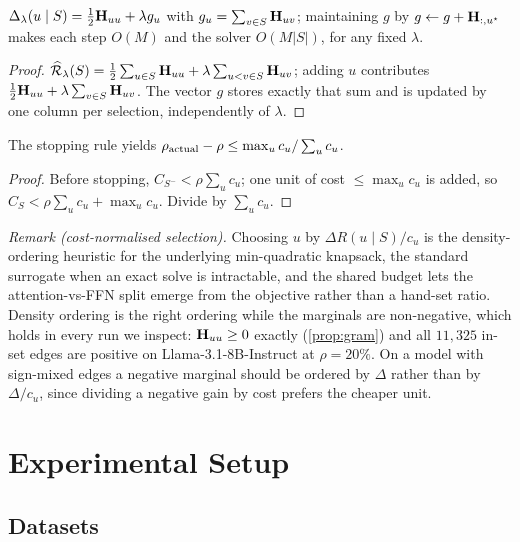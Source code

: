 \label{app:th-solver}
\begin{proposition}\label{prop:greedy}
$\Delta_\lambda(u\mid S)=\tfrac12\mathbf{H}_{uu}+\lambda g_u$ with $g_u=\sum_{v\in S}\mathbf{H}_{uv}$;
maintaining $g$ by $g\leftarrow g+\mathbf{H}_{:,u^\star}$ makes each step $O(M)$ and the solver $O(M|S|)$,
for any fixed $\lambda$.
\end{proposition}
\begin{proof}
$\widehat{\mathcal R}_\lambda(S)=\tfrac12\sum_{u\in S}\mathbf{H}_{uu}+\lambda\sum_{u<v\in S}\mathbf{H}_{uv}$;
adding $u$ contributes $\tfrac12\mathbf{H}_{uu}+\lambda\sum_{v\in S}\mathbf{H}_{uv}$. The vector $g$ stores
exactly that sum and is updated by one column per selection, independently of $\lambda$.
\end{proof}
\begin{proposition}\label{prop:overshoot}
The stopping rule yields $\rho_{\rm actual}-\rho\le \max_u c_u/\sum_u c_u$.
\end{proposition}
\begin{proof}
Before stopping, $C_{S^-}<\rho\sum_u c_u$; one unit of cost $\le\max_u c_u$ is added, so
$C_S<\rho\sum_u c_u+\max_u c_u$. Divide by $\sum_u c_u$.
\end{proof}
\noindent\emph{Remark (cost-normalised selection).} Choosing $u$ by $\Delta R(u\mid S)/c_u$ is the
density-ordering heuristic for the underlying min-quadratic knapsack, the standard surrogate when an
exact solve is intractable, and the shared budget lets the attention-vs-FFN split emerge from the
objective rather than a hand-set ratio. Density ordering is the right ordering while the marginals are
non-negative, which holds in every run we inspect: $\mathbf{H}_{uu}\ge0$ exactly (\cref{prop:gram}) and all
$11{,}325$ in-set edges are positive on Llama-3.1-8B-Instruct at $\rho{=}20\%$. On a model with
sign-mixed edges a negative marginal should be ordered by $\Delta$ rather than by $\Delta/c_u$, since
dividing a negative gain by cost prefers the cheaper unit.

\clearpage

\section{Experimental Setup}
\label{app:setup}
\subsection{Datasets}

